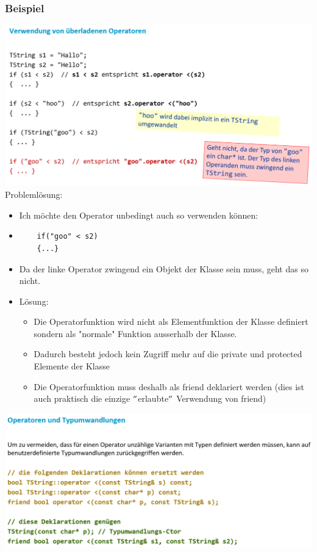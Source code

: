 \subsubsection{Beispiel}
\includegraphics[width=\linewidth]{images/verwendung.png}
Problemlösung:
\begin{itemize}
	\item Ich möchte den Operator unbedingt auch so verwenden können:
	\noindent
	\item[\-]\vspace{-\baselineskip}\begin{minipage}{\linewidth}
	\begin{lstlisting}
	if("goo" < s2)
	{...}
	\end{lstlisting}
	\end{minipage}
	\item Da der linke Operator zwingend ein Objekt der Klasse sein muss, geht das so nicht.
	\item Lösung:
	\begin{itemize}
		\item Die Operatorfunktion wird nicht als Elementfunktion der Klasse definiert sondern als "normale" Funktion ausserhalb der Klasse.
		\item Dadurch besteht jedoch kein Zugriff mehr auf die private und protected Elemente der Klasse
		\item Die Operatorfunktion muss deshalb als friend deklariert werden (dies ist auch praktisch die einzige $"$erlaubte$"$ Verwendung von friend)
	\end{itemize}
\end{itemize}

\includegraphics[width=\linewidth]{images/operatorenTypumwandlungen.png}

